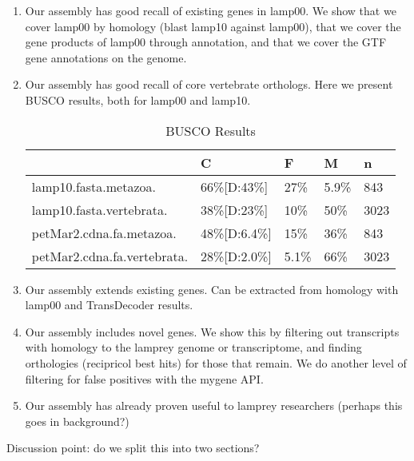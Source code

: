 \documentclass[10pt,twocolumn,linenumbers]{article}
\begin{document}
\begin{enumerate}
\item Our assembly has good recall of existing genes in lamp00. We show that we cover lamp00 by
homology (blast lamp10 against lamp00), that we cover the gene products of lamp00 through 
annotation, and that we cover the GTF gene annotations on the genome.
\item Our assembly has good recall of core vertebrate orthologs. Here we present BUSCO results, 
both for lamp00 and lamp10.



\begin{table*}[t]
\caption {BUSCO Results}
\begin{center}

\begin{tabular}{lllll}
\toprule
{} &            C &     F &     M &     n \\
\midrule
lamp10.fasta.metazoa.       &   66\%[D:43\%] &   27\% &  5.9\% &   843
\\
lamp10.fasta.vertebrata.    &   38\%[D:23\%] &   10\% &   50\% &  3023
\\
petMar2.cdna.fa.metazoa.    &  48\%[D:6.4\%] &   15\% &   36\% &   843
\\
petMar2.cdna.fa.vertebrata. &  28\%[D:2.0\%] &  5.1\% &   66\% &  3023
\\
\bottomrule
\end{tabular}



\end{center}
\end{table*}

\item Our assembly extends existing genes. Can be extracted from homology with lamp00 and 
TransDecoder results.
\item Our assembly includes novel genes. We show this by filtering out transcripts with homology 
to the lamprey genome or transcriptome, and finding orthologies (recipricol best hits) for those 
that remain. We do another level of filtering for false positives with the mygene API.
\item Our assembly has already proven useful to lamprey researchers \citep{ren_genome-wide_2015}
(perhaps this goes in background?)
\end{enumerate}

Discussion point: do we split this into two sections?

\end{document}
